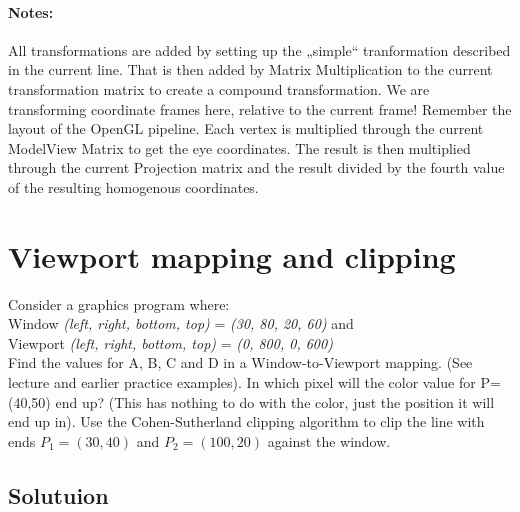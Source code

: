 \documentclass[12pt,fleqn,reqno]{article}
\begin{document}
\paragraph{Notes:}
All transformations are added by setting up the „simple“ tranformation described in the current line. That is then added by Matrix Multiplication to the current transformation matrix to create a compound transformation.
We are transforming coordinate frames here, relative to the current frame! Remember the layout of the OpenGL pipeline. Each vertex is multiplied through the current ModelView Matrix to get the eye coordinates. The result is then multiplied through the current Projection matrix and the result divided by the fourth value of the resulting homogenous coordinates.

\section{Viewport mapping and clipping}
Consider a graphics program where: \\
 Window \emph{(left, right, bottom, top)} =  \emph{(30, 80, 20, 60)} and \\
 Viewport  \emph{(left, right, bottom, top)} =  \emph{(0, 800, 0, 600)} \\
Find the values for A, B, C and D in a Window-to-Viewport mapping. (See lecture and earlier practice examples).
In which pixel will the color value for P=(40,50) end up? (This has nothing to do with the color, just the position it will end up in).
Use the Cohen-Sutherland clipping algorithm to clip the line with ends \(P_1=(30, 40)\) and \(P_2=(100, 20)\) against the window.

\subsection{Solutuion}
\end{document}
